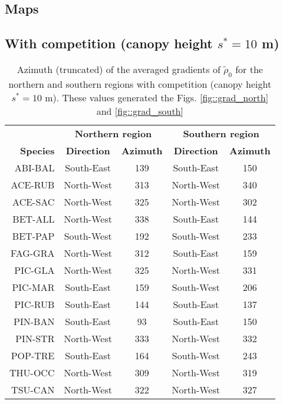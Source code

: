 \documentclass[letterpaper, 12pt]{article}
\newcommand {\s}{{s}^{*}}
\theoremstyle{theo}
\begin{document}
\tableofcontents

\begin{refsection}
\begin{onehalfspace}
\section{Maps} \label{app::maps}
	\subsection{With competition (canopy height $ \s = 10 $ m)}
	\begin{table}[ht]
	\centering
	\caption{Azimuth (truncated) of the averaged gradients of $ \tilde \rho_0 $ for the northern and southern regions with competition (canopy height $ \s = 10 $ m). These values generated the Figs. \ref{fig::grad_north} and \ref{fig::grad_south} \label{tab::azimuth}}
	\begin{tabular}{rcccc}
		\toprule
			~ & \multicolumn{2}{c}{\textbf{Northern region}} & \multicolumn{2}{c}{\textbf{Southern region}} \\
			\cmidrule(lr){2-3} \cmidrule(lr){4-5}
			\textbf{Species} & \textbf{Direction} & \textbf{Azimuth} & \textbf{Direction} & \textbf{Azimuth} \\
		\midrule
			ABI-BAL & South-East & 139 & South-East & 150 \\
			ACE-RUB & North-West & 313 & North-West & 340 \\
			ACE-SAC & North-West & 325 & North-West & 302 \\
			BET-ALL & North-West & 338 & South-East & 144 \\
			BET-PAP & South-West & 192 & South-West & 233 \\
			FAG-GRA & North-West & 312 & South-East & 159 \\
			PIC-GLA & North-West & 325 & North-West & 331 \\
			PIC-MAR & South-East & 159 & South-West & 206 \\
			PIC-RUB & South-East & 144 & South-East & 137 \\
			PIN-BAN & South-East & 93 & South-East & 150 \\
			PIN-STR & North-West & 333 & North-West & 332 \\
			POP-TRE & South-East & 164 & South-West & 243 \\
			THU-OCC & North-West & 309 & North-West & 319 \\
			TSU-CAN & North-West & 322 & North-West & 327 \\
		\bottomrule
	\end{tabular}
	\end{table}
	

\end{onehalfspace}
\end{refsection}
\end{document}
